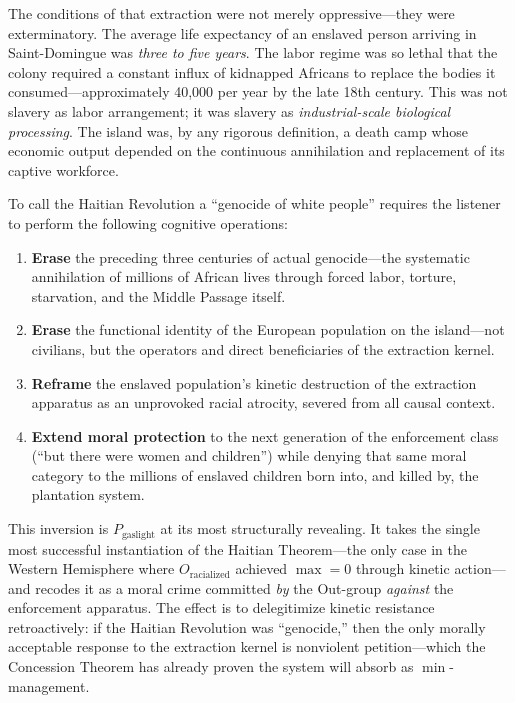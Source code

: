 \documentclass[12pt,openany]{book}
\begin{document}
The conditions of that extraction were not merely oppressive---they were exterminatory. The average life expectancy of an enslaved person arriving in Saint-Domingue was \textit{three to five years}. The labor regime was so lethal that the colony required a constant influx of kidnapped Africans to replace the bodies it consumed---approximately 40,000 per year by the late 18th century. This was not slavery as labor arrangement; it was slavery as \textit{industrial-scale biological processing}. The island was, by any rigorous definition, a death camp whose economic output depended on the continuous annihilation and replacement of its captive workforce.

To call the Haitian Revolution a ``genocide of white people'' requires the listener to perform the following cognitive operations:
\begin{enumerate}
    \item \textbf{Erase} the preceding three centuries of actual genocide---the systematic annihilation of millions of African lives through forced labor, torture, starvation, and the Middle Passage itself.
    \item \textbf{Erase} the functional identity of the European population on the island---not civilians, but the operators and direct beneficiaries of the extraction kernel.
    \item \textbf{Reframe} the enslaved population's kinetic destruction of the extraction apparatus as an unprovoked racial atrocity, severed from all causal context.
    \item \textbf{Extend moral protection} to the next generation of the enforcement class (``but there were women and children'') while denying that same moral category to the millions of enslaved children born into, and killed by, the plantation system.
\end{enumerate}

This inversion is $P_{\text{gaslight}}$ at its most structurally revealing. It takes the single most successful instantiation of the Haitian Theorem---the only case in the Western Hemisphere where $O_{\text{racialized}}$ achieved $\max = 0$ through kinetic action---and recodes it as a moral crime committed \textit{by} the Out-group \textit{against} the enforcement apparatus. The effect is to delegitimize kinetic resistance retroactively: if the Haitian Revolution was ``genocide,'' then the only morally acceptable response to the extraction kernel is nonviolent petition---which the Concession Theorem has already proven the system will absorb as $\min$-management.
\end{document}
